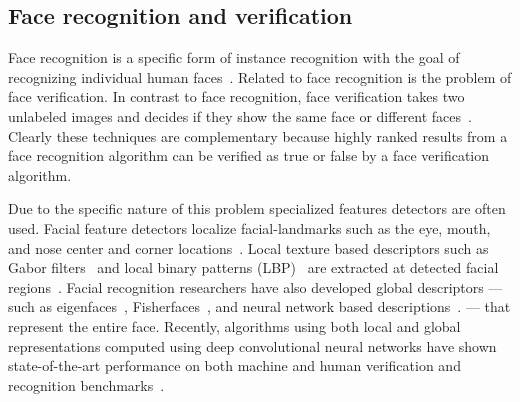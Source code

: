 

    \subsection{Face recognition and verification}
        Face recognition is a specific form of instance recognition with the goal of recognizing individual human
        faces~\cite{zhao_face_2003, huang_labeled_2007}. Related to face recognition is the problem of face
        verification. In contrast to face recognition, face verification takes two unlabeled images and decides if they
        show the same face or different faces~\cite{taigman_deepface_2014}. Clearly these techniques are complementary
        because highly ranked results from a face recognition algorithm can be verified as true or false by a face
        verification algorithm.

        Due to the specific nature of this problem specialized features detectors are often used. Facial feature
        detectors localize facial-landmarks such as the eye, mouth, and nose center and corner
        locations~\cite{dantone_realtime_2012, berg_tomvspete_2012}. Local texture based descriptors such as Gabor
        filters~\cite{liu_gabor_2002, zhang_histogram_2007, shen_review_2006} and local binary patterns
        (LBP)~\cite{ahonen_face_2006, chen_blessing_2013} are extracted at detected facial
        regions~\cite{belhumeur_localizing_2011}. Facial recognition researchers have also developed global descriptors
        --- such as eigenfaces~\cite{turk_eigenfaces_1991}, Fisherfaces~\cite{belhumeur_eigenfaces_1997}, and neural
        network based descriptions~\cite{lawrence_face_1997, taigman_deepface_2014}. --- that represent the entire face.
        Recently, algorithms using both local and global representations computed using deep convolutional neural
        networks have shown state-of-the-art performance on both machine and human verification and recognition
        benchmarks~\cite{taigman_deepface_2014}.
        

